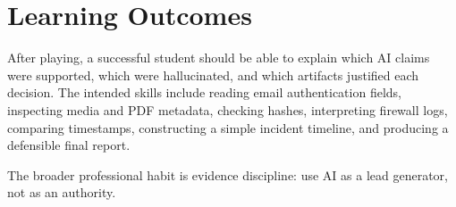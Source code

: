 \section{Learning Outcomes}

After playing, a successful student should be able to explain which AI claims were supported, which were hallucinated, and which artifacts justified each decision. The intended skills include reading email authentication fields, inspecting media and PDF metadata, checking hashes, interpreting firewall logs, comparing timestamps, constructing a simple incident timeline, and producing a defensible final report.

The broader professional habit is evidence discipline: use AI as a lead generator, not as an authority.
